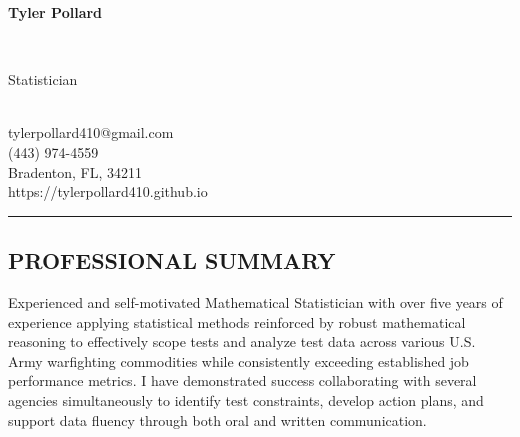\documentclass[
  11pt,
]{article}
\author{}
\date{\vspace{-2.5em}}
\begin{document}


\newcommand{\cvtag}[1]{%
  \tikz[baseline]\node[anchor=base,draw=body,fill=body!10,rounded corners,inner xsep=1ex,inner ysep =0.75ex,text height=1.5ex,text depth=.25ex]{#1};
}

\setcolumnwidth{2.25in}
\setlength{\columnsep}{0.06\textwidth}


\begin{paracol}{2}
\begin{leftcolumn}
\begin{RaggedRight}
\begin{fontsize}{24}{28}\selectfont \textbf{Tyler Pollard} 
  \end{fontsize}
\end{RaggedRight} \\
\begin{fontsize}{16}{1}\selectfont Statistician 
  \end{fontsize} \\

\vspace{-1em}
\faEnvelope \hspace{0.75em} tylerpollard410@gmail.com \\
\faPhone \hspace{0.75em} (443) 974-4559 \\
\faMapMarker \hspace{0.75em} Bradenton, FL, 34211 \\ 
\faUser \hspace{0.75em} {https://tylerpollard410.github.io} \\
\hrule

\subsection{PROFESSIONAL SUMMARY}
\begin{flushleft}
Experienced and self-motivated Mathematical Statistician with over five years of experience applying statistical methods reinforced by robust mathematical reasoning to effectively scope tests and analyze test data across various U.S. Army warfighting commodities while consistently exceeding established job performance metrics. I have demonstrated success collaborating with several agencies simultaneously to identify test constraints, develop action plans, and support data fluency through both oral and written communication.
\end{flushleft}


\end{leftcolumn}
\end{paracol}
\end{document}
